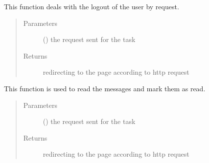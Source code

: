 \documentclass[letterpaper,10pt,english]{sphinxmanual}
\begin{document}
\begin{fulllineitems}
\label{\detokenize{janta:janta.views.logout}}
This function deals with the logout of the user by request.
\begin{quote}\begin{description}
\item[{Parameters}] \leavevmode
{} () \textendash{} the request sent for the task

\item[{Returns}] \leavevmode
redirecting to the page according to http request

\end{description}\end{quote}

\end{fulllineitems}


\begin{fulllineitems}
\label{\detokenize{janta:janta.views.mark_as_read}}
This function is used to read the messages and mark them as read.
\begin{quote}\begin{description}
\item[{Parameters}] \leavevmode
{} () \textendash{} the request sent for the task

\item[{Returns}] \leavevmode
redirecting to the page according to http request

\end{description}\end{quote}

\end{fulllineitems}

\end{document}
